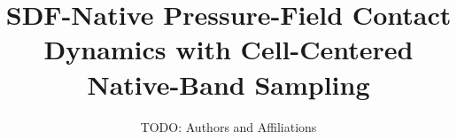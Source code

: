 \documentclass[11pt,a4paper]{ctexart}
\title{SDF-Native Pressure-Field Contact Dynamics with Cell-Centered Native-Band Sampling}
\author{TODO: Authors and Affiliations}
\date{}
\begin{document}
\maketitle











\appendix
\FloatBarrier


%
%
\end{document}
